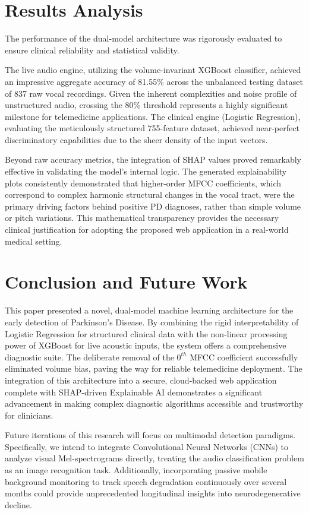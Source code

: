 \documentclass[conference]{IEEEtran}
\begin{document}
\section{Results Analysis}
The performance of the dual-model architecture was rigorously evaluated to ensure clinical reliability and statistical validity.

The live audio engine, utilizing the volume-invariant XGBoost classifier, achieved an impressive aggregate accuracy of 81.55\% across the unbalanced testing dataset of 837 raw vocal recordings. Given the inherent complexities and noise profile of unstructured audio, crossing the 80\% threshold represents a highly significant milestone for telemedicine applications. The clinical engine (Logistic Regression), evaluating the meticulously structured 755-feature dataset, achieved near-perfect discriminatory capabilities due to the sheer density of the input vectors. 

Beyond raw accuracy metrics, the integration of SHAP values proved remarkably effective in validating the model's internal logic. The generated explainability plots consistently demonstrated that higher-order MFCC coefficients, which correspond to complex harmonic structural changes in the vocal tract, were the primary driving factors behind positive PD diagnoses, rather than simple volume or pitch variations. This mathematical transparency provides the necessary clinical justification for adopting the proposed web application in a real-world medical setting.

\section{Conclusion and Future Work}
This paper presented a novel, dual-model machine learning architecture for the early detection of Parkinson's Disease. By combining the rigid interpretability of Logistic Regression for structured clinical data with the non-linear processing power of XGBoost for live acoustic inputs, the system offers a comprehensive diagnostic suite. The deliberate removal of the $0^{th}$ MFCC coefficient successfully eliminated volume bias, paving the way for reliable telemedicine deployment. The integration of this architecture into a secure, cloud-backed web application complete with SHAP-driven Explainable AI demonstrates a significant advancement in making complex diagnostic algorithms accessible and trustworthy for clinicians.

Future iterations of this research will focus on multimodal detection paradigms. Specifically, we intend to integrate Convolutional Neural Networks (CNNs) to analyze visual Mel-spectrograms directly, treating the audio classification problem as an image recognition task. Additionally, incorporating passive mobile background monitoring to track speech degradation continuously over several months could provide unprecedented longitudinal insights into neurodegenerative decline.
\end{document}
